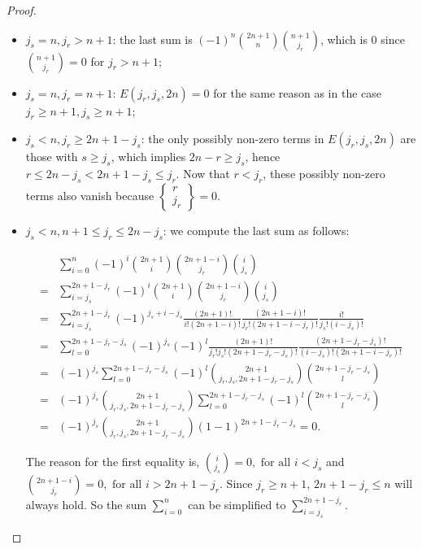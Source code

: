 \documentclass[11pt]{article}
\begin{document}
\begin{proof}
\begin{itemize}
    \item \(j_s = n, j_r > n + 1\): the last sum is \((-1)^n\binom{2n+1}{n}\binom{n+1}{j_r}\), which is 0 since \(\binom{n+1}{j_r} = 0\) for \(j_r > n + 1\);
    \item \(j_s = n, j_r = n + 1\): \(E(j_r, j_s, 2n) = 0\) for the same reason as in the case \(j_r \geq n + 1, j_s \geq n + 1\);
    \item \(j_s < n, j_r\geq 2n + 1 - j_s\): the only possibly non-zero terms in \(E(j_r, j_s, 2n)\) are those with \(s\geq j_s\), which implies \(2n-r\geq j_s\), hence \(r\leq 2n-j_s < 2n + 1 - j_s \leq j_r\). Now that \(r < j_r\), these possibly non-zero terms also vanish because \(\begin{Bmatrix}
        r\\ j_r
    \end{Bmatrix} = 0\).
    \item \(j_s < n, n + 1\leq j_r\leq 2n - j_s\): we compute the last sum as follows: 
    
    \begin{align*}
        &\sum_{i = 0}^n(-1)^i\binom{2n+1}{i}\binom{2n+1-i}{j_r}\binom{i}{j_s}\\ 
        =&\sum_{i = j_s}^{2n + 1 - j_r}(-1)^i\binom{2n+1}{i}\binom{2n+1-i}{j_r}\binom{i}{j_s}\\ 
        =&\sum_{i = j_s}^{2n + 1 - j_r}(-1)^{j_s + i - j_s}\frac{(2n+1)!}{i!(2n+1-i)!}\frac{(2n+1-i)!}{j_r!(2n+1-i-j_r)!}\frac{i!}{j_s!(i-j_s)!}\\ 
        =&\sum_{l = 0}^{2n + 1 - j_r - j_s}(-1)^{j_s}(-1)^l\frac{(2n+1)!}{j_r!j_s!(2n+1-j_r-j_s)!}\frac{(2n+1-j_r-j_s)!}{(i-j_s)!(2n+1-i-j_r)!}\\ 
        =&(-1)^{j_s}\sum_{l = 0}^{2n + 1 - j_r - j_s}(-1)^l\binom{2n+1}{j_r, j_s, 2n+1-j_r-j_s}\binom{2n+1-j_r-j_s}{l}\\ 
        =&(-1)^{j_s}\binom{2n + 1}{j_r, j_s, 2n + 1 - j_r - j_s}\sum_{l = 0}^{2n + 1 - j_r - j_s}(-1)^l\binom{2n + 1 - j_r - j_s}{l}\\ 
        =&(-1)^{j_s}\binom{2n + 1}{j_r, j_s, 2n + 1 - j_r - j_s}(1 - 1)^{2n + 1 - j_r - j_s} = 0.
    \end{align*}

    The reason for the first equality is, \(\binom{i}{j_s} = 0, \text{ for all } i < j_s\) and \(\binom{2n + 1 - i}{j_r} = 0, \text{ for all } i > 2n + 1 - j_r\). Since \(j_r\geq n + 1\), \(2n + 1 - j_r\leq n\) will always hold. So the sum \(\sum_{i = 0}^n\) can be simplified to \(\sum_{i = j_s}^{2n + 1 - j_r}\). 


\end{itemize}
\end{proof}
\end{document}

